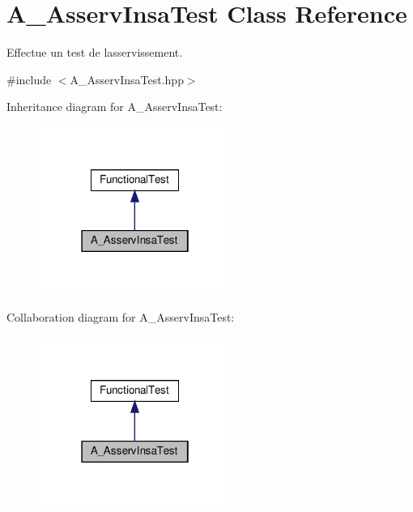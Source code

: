 \hypertarget{classA__AsservInsaTest}{}\section{A\+\_\+\+Asserv\+Insa\+Test Class Reference}
\label{classA__AsservInsaTest}


Effectue un test de l\textquotesingle{}asservissement.  




{\ttfamily \#include $<$A\+\_\+\+Asserv\+Insa\+Test.\+hpp$>$}



Inheritance diagram for A\+\_\+\+Asserv\+Insa\+Test\+:
\nopagebreak
\begin{figure}[H]
\begin{center}
\leavevmode
\includegraphics[width=178pt]{classA__AsservInsaTest__inherit__graph}
\end{center}
\end{figure}


Collaboration diagram for A\+\_\+\+Asserv\+Insa\+Test\+:
\nopagebreak
\begin{figure}[H]
\begin{center}
\leavevmode
\includegraphics[width=178pt]{classA__AsservInsaTest__coll__graph}
\end{center}
\end{figure}

